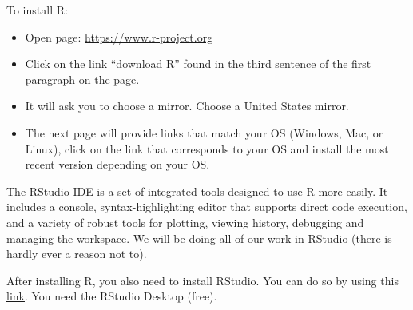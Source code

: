 \documentclass{./../Latex/handout}
\begin{document}
\thispagestyle{plain}

To install R:
\begin{itemize}
\item Open page: \href{https://www.r-project.org}{https://www.r-project.org}
\item 
Click on the link “download R” found in the third sentence of the first paragraph on the page.
\item It will ask you to choose a mirror. Choose a United States mirror.
\item The next page will provide links that match your OS (Windows, Mac, or Linux), click on the link that corresponds to your OS and install the most recent version depending on your OS. %
\end{itemize}

The RStudio IDE is a set of integrated tools designed to use R more easily. It includes a console,
syntax-highlighting editor that supports direct code execution, and a variety of robust tools for
plotting, viewing history, debugging and managing the workspace. We will be doing all of our work
in RStudio (there is hardly ever a reason not to).

After installing R, you also need to install RStudio. You can do so by using this \href{https://www.rstudio.com/products/rstudio/download}{link}. You need the RStudio Desktop (free).
\end{document}
